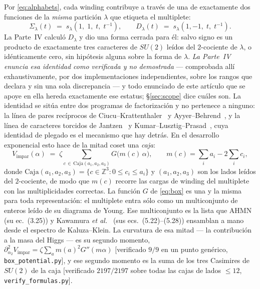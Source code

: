 \documentclass[11pt,a4paper]{article}
\newcommand{\ZZ}{\mathbb{Z}}
\newcommand{\su}[1]{SU(#1)}
\newcommand{\Sig}{\Sigma_\lambda}
\newcommand{\Dl}{D_\lambda}
\begin{document}
Por \eqref{eq:alphabets}, cada winding contribuye a través de una de exactamente dos funciones de la
\emph{misma} partición $\lambda$ que etiqueta el multiplete:
\begin{equation}\label{eq:SigD}
\Sig(t) \;=\; s_\lambda(1,\;1,\;t,\;t^{-1}),
\qquad
\Dl(t) \;=\; s_\lambda(1,-1,\;t,\;t^{-1}).
\end{equation}
La Parte~IV calculó $\Dl$ y dio una forma cerrada para él: salvo signo es un producto de
exactamente tres caracteres de $\su2$ leídos del $2$-cociente de $\lambda$, o idénticamente cero, sin
hipótesis alguna sobre la forma de $\lambda$. \emph{La Parte~IV enuncia esa identidad como verificada
y no demostrada} --- comprobada allí exhaustivamente, por dos implementaciones independientes, sobre
los rangos que declara y sin una sola discrepancia --- y todo enunciado de este artículo que se apoye
en ella hereda exactamente ese estatus; \S\ref{sec:scope} dice cuáles son. La identidad se sitúa
entre dos programas de factorización y no pertenece a ninguno: la línea de pares recíprocos de
Ciucu--Krattenthaler~\cite{CK} y Ayyer--Behrend~\cite{AB}, y la línea de caracteres torcidos de
Jantzen~\cite{Jantzen} y Kumar--Lusztig--Prasad~\cite{KLP}, cuya identidad de plegado es el mecanismo
que hay detrás. En el desarrollo exponencial esto
hace de la mitad coset una \emph{caja}:
\begin{equation}\label{eq:box}
V_{\mathrm{impar}}(\alpha) \;=\; \zeta \sum_{c\,\in\,\mathrm{Caja}(a_1,a_2,a_3)} G\big(m(c)\,\alpha\big),
\qquad m(c)=\textstyle\sum_i a_i - 2\sum_i c_i ,
\end{equation}
donde $\mathrm{Caja}(a_1,a_2,a_3)=\{c\in\ZZ^3 : 0\le c_i\le a_i\}$ y $(a_1,a_2,a_3)$ son los lados
leídos del $2$-cociente, de modo que $m(c)$ recorre las cargas de winding del multiplete con las
multiplicidades correctas. La función $G$ de \eqref{eq:box} es una y la misma para toda
representación: el multiplete entra sólo como un multiconjunto de enteros leído de su diagrama de
Young. Ese multiconjunto es la lista que AHMN~\cite{AHMN} (su ec.~(3.25)) y Kawamura \emph{et
al.}~\cite{KKKY} (sus ecs.~(5.22)--(5.28)) ensamblan a mano desde el espectro de Kaluza--Klein. La
curvatura de esa mitad --- la contribución a la masa del Higgs --- es su segundo momento,
$\partial^2_{\alpha_2}V_{\mathrm{impar}}=\zeta\sum_a m(a)^2G''(m\alpha)$ [verificado $9/9$ en un punto
genérico, \texttt{box\_potential.py}], y ese segundo momento es la suma de los tres Casimires de
$\su2$ de la caja [verificado $2197/2197$ sobre todas las cajas de lados $\le12$,
\texttt{verify\_formulas.py}].
\end{document}
